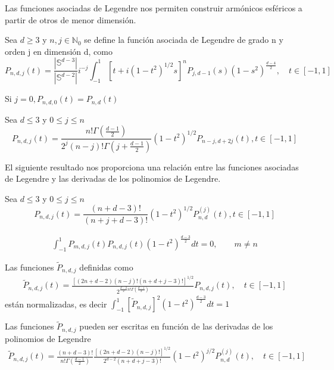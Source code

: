 Las funciones asociadas de Legendre \cite[sec. 2.10]{libro_esfarm} nos permiten construir armónicos esféricos a partir de otros de menor dimensión.
\begin{defn}Sea $d\ge3$ y $n,j \in \mathds{N}_0$ se define la función asociada de Legendre de grado n y orden j en dimensión d, como
	$$
	P_{n,d,j}(t) = \frac{|\mathds{S}^{d-3}|}{|\mathds{S}^{d-2}|}i^{-j} \int_{-1}^{1}\left[t+i(1-t^2)^{1/2}s\right]^n P_{j,d-1}(s)(1-s^2)^{\frac{d-4}{2}}, \quad t\in[-1,1]
	$$
\end{defn}
\begin{rem}Si $j=0, P_{n,d,0}(t)=P_{n,d}(t)$
\end{rem}
\begin{prop}Sea $d\le3$ y $0\le j \le n$ 
	$$	P_{n,d,j}(t) = \frac{n!\Gamma(\frac{d-1}{2})}{2^j(n-j)!\Gamma(j+\frac{d-1}{2})}(1-t^2)^{1/2} P_{n-j,d+2j}(t), t\in[-1,1]$$
\end{prop}
El siguiente resultado nos proporciona una relación entre las funciones asociadas de Legendre y las derivadas de los polinomios de Legendre.
\begin{prop}Sea $d\le3$ y $0\le j \le n$ 
	$$	P_{n,d,j}(t) = \frac{(n+d-3)!}{(n+j+d-3)!}(1-t^2)^{1/2} P^{(j)}_{n,d}(t), t\in[-1,1]$$
\end{prop}
\begin{prop}
	\begin{gather*}
	\int_{-1}^{1} P_{m,d,j}(t)P_{n,d,j}(t)(1-t^2)^{\frac{d-3}{2}} dt = 0, \qquad m \neq n
	\end{gather*}
\end{prop}
\begin{prop} Las funciones $\tilde{P}_{n,d,j}$ definidas como
	\begin{gather*}
	\tilde{P}_{n,d,j}(t) = \frac{[(2n+d-2)(n-j)!(n+d+j-3)!]^{1/2}}{2^{\frac{d-2}{2}n!\Gamma(\frac{d-1}{2})}}P_{n,d,j}(t), \quad t\in[-1,1]
	\end{gather*}
	están normalizadas, es decir $\int_{-1}^{1} [	\tilde{P}_{n,d,j}]^2(1-t^2)^\frac{d-3}{2} dt = 1$
\end{prop}
\begin{rem}\label{note:fun_leg}Las funciones $	\tilde{P}_{n,d,j}$ pueden ser escritas en función de las derivadas de los polinomios de Legendre 
	\begin{gather*}
	\tilde{P}_{n,d,j}(t) =\frac{(n+d-3)!}{n!\Gamma(\frac{d-1}{2})} \frac{[(2n+d-2)(n-j)!]^{1/2}}{2^{d-2}(n+d+j-3)!}(1-t^2)^{j/2}P^{(j)}_{n,d}(t), \quad t\in[-1,1]
	\end{gather*}
\end{rem}
